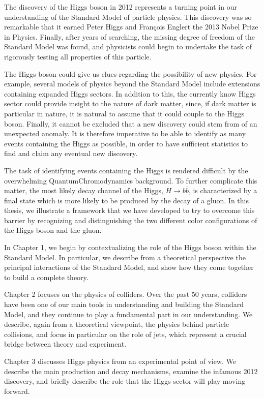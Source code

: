 \documentclass[10pt,a4paper]{book}
\begin{document}
The discovery of the Higgs boson in 2012 represents a turning point in our understanding of the Standard Model of particle physics. This discovery was so remarkable that it earned Peter Higgs and Fran\c{c}ois Englert the 2013 Nobel Prize in Physics. Finally, after years of searching, the missing degree of freedom of the Standard Model was found, and physicists could begin to undertake the task of rigorously testing all properties of this particle.

The Higgs boson could give us clues regarding the possibility of new physics. For example, several models of physics beyond the Standard Model include extensions containing expanded Higgs sectors. In addition to this, the currently know Higgs sector could provide insight to the nature of dark matter, since, if dark matter is particular in nature, it is natural to assume that it could couple to the Higgs boson.  Finally, it cannot be excluded that a new discovery could stem from of an unexpected anomaly. It is therefore imperative to be able to identify as many events containing the Higgs as possible, in order to have sufficient statistics to find and claim any eventual new discovery.

The task of identifying events containing the Higgs is rendered difficult by the overwhelming QuantumChromodynamics background. To further complicate this matter, the most likely decay channel of the Higgs, $H\rightarrow b\overline{b}$, is characterized by a final state which is more likely to be produced by the decay of a gluon. In this thesis, we illustrate a framework that we have developed to try to overcome this barrier by recognizing and distinguishing the two different color configurations of the Higgs boson and the gluon.

In Chapter 1, we begin by contextualizing the role of the Higgs boson within the Standard Model. In particular, we describe from a theoretical perspective the principal interactions of the Standard Model, and show how they come together to build a complete theory.

Chapter 2 focuses on the physics of colliders. Over the past 50 years, colliders have been one of our main tools in understanding and building the Standard Model, and they continue to play a fundamental part in our understanding. We describe, again from a theoretical viewpoint, the physics behind particle collisions, and focus in particular on the role of jets, which represent a crucial bridge between theory and experiment.

Chapter 3 discusses Higgs physics from an experimental point of view. We describe the main production and decay mechanisms, examine the infamous 2012 discovery, and briefly describe the role that the Higgs sector will play moving forward.
\end{document}
